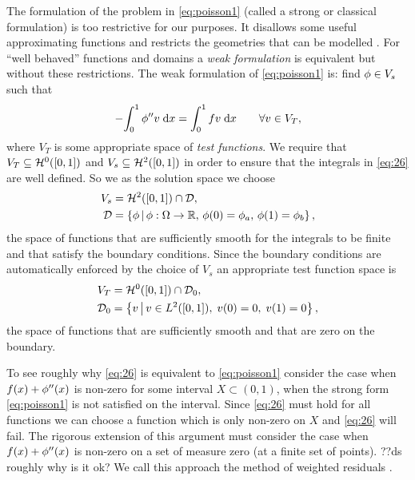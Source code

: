 {The formulation of the problem in \cref{eq:poisson1} (called a strong or classical formulation) is too restrictive for our purposes.
It disallows some useful approximating functions and restricts the geometries that can be modelled \cite[14]{HowardElmanDavidSilvester2006}.
For ``well behaved'' functions and domains a \emph{weak formulation} is equivalent but without these restrictions.
The weak formulation of \cref{eq:poisson1} is: find $\phi\in V_{s}$ such that
\begin{equation}
  -{\int_0^1 \phi'' v {\; \mathrm{{d}}}{x}} = {\int_0^1 f v {\; \mathrm{{d}}}{x}} \qquad \forall v \in V_{T},
  \label{eq:26}
\end{equation}
where $V_{T}$ is some appropriate space of \emph{test functions}.
We require that $V_{T}\subseteq \mathcal{H}^0([0,1])$ and $V_s \subseteq \mathcal{H}^2([0,1])$ in order to ensure that the integrals in \cref{eq:26} are well defined.
So we as the solution space we choose
\begin{equation}
  \begin{aligned}
    V_{s} &= \mathcal{H}^2([0,1]) \cap \mathcal{D}, \\
    \mathcal{D} &= \left\{ {\phi} \,\middle|\, {\phi: \Omega \rightarrow \mathbb{R} ,\, \phi(0) = \phi_{a},\, \phi(1) = \phi_{b}} \right\},
  \end{aligned}
\end{equation}
\ie the space of functions that are sufficiently smooth for the integrals to be finite and that satisfy the boundary conditions.
Since the boundary conditions are automatically enforced by the choice of $V_s$ an appropriate test function space is
\begin{equation}
  \label{eq:28}
  \begin{aligned}
    V_{T} &= \mathcal{H}^0([0,1]) \cap \mathcal{D}_0, \\
    \mathcal{D}_0 &= \left\{ {v} \,\middle|\, {v \in L^2([0,1]),\; v(0) =0,\; v(1)=0} \right\},
  \end{aligned}
\end{equation}
\ie the space of functions that are sufficiently smooth and that are zero on the boundary.

To see roughly why \cref{eq:26} is equivalent to \cref{eq:poisson1} consider the case when $f(x) + \phi''(x)$ is non-zero for some interval $X \subset (0,1)$, \ie when the strong form \cref{eq:poisson1} is not satisfied on the interval.
Since \cref{eq:26} must hold for all functions we can choose a function which is only non-zero on $X$ and \cref{eq:26} will fail.
The rigorous extension of this argument must consider the case when $f(x) + \phi''(x)$ is non-zero on a set of measure zero (\eg at a finite set of points). ??ds roughly why is it ok?
We call this approach the method of weighted residuals \cite[210, 214]{Zeinkiewicz1967}.

}
